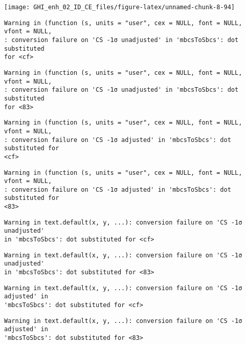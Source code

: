 \documentclass[
  10pt,
  a4paper,oneside]{article}
\begin{document}
\begin{center}\texttt{[image: GHI\_enh\_02\_ID\_CE\_files/figure-latex/unnamed-chunk-8-94]} \end{center}

\begin{verbatim}
Warning in (function (s, units = "user", cex = NULL, font = NULL, vfont = NULL,
: conversion failure on 'CS -1σ unadjusted' in 'mbcsToSbcs': dot substituted
for <cf>
\end{verbatim}

\begin{verbatim}
Warning in (function (s, units = "user", cex = NULL, font = NULL, vfont = NULL,
: conversion failure on 'CS -1σ unadjusted' in 'mbcsToSbcs': dot substituted
for <83>
\end{verbatim}

\begin{verbatim}
Warning in (function (s, units = "user", cex = NULL, font = NULL, vfont = NULL,
: conversion failure on 'CS -1σ adjusted' in 'mbcsToSbcs': dot substituted for
<cf>
\end{verbatim}

\begin{verbatim}
Warning in (function (s, units = "user", cex = NULL, font = NULL, vfont = NULL,
: conversion failure on 'CS -1σ adjusted' in 'mbcsToSbcs': dot substituted for
<83>
\end{verbatim}

\begin{verbatim}
Warning in text.default(x, y, ...): conversion failure on 'CS -1σ unadjusted'
in 'mbcsToSbcs': dot substituted for <cf>
\end{verbatim}

\begin{verbatim}
Warning in text.default(x, y, ...): conversion failure on 'CS -1σ unadjusted'
in 'mbcsToSbcs': dot substituted for <83>
\end{verbatim}

\begin{verbatim}
Warning in text.default(x, y, ...): conversion failure on 'CS -1σ adjusted' in
'mbcsToSbcs': dot substituted for <cf>
\end{verbatim}

\begin{verbatim}
Warning in text.default(x, y, ...): conversion failure on 'CS -1σ adjusted' in
'mbcsToSbcs': dot substituted for <83>
\end{verbatim}
\end{document}
